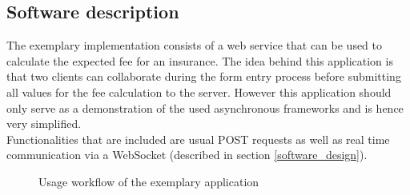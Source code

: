 \subsection{Software description}
\label{software_description}
\FloatBarrier
The exemplary implementation consists of a web service that can be used to calculate
the expected fee for an insurance. The idea behind this application is that
two clients can collaborate during the form entry process before submitting
all values for the fee calculation to the server.
However this application should only serve as a demonstration of the used asynchronous 
frameworks and is hence very simplified.\\
Functionalities that are included are usual POST requests as well as real time communication
via a WebSocket (described in section \ref{software_design}).

\begin{figure}[h]
	\centering
	\setlength\fboxsep{2pt}
	\caption{Usage workflow of the exemplary application}
	\label{fig:application_workflow}
\end{figure}


